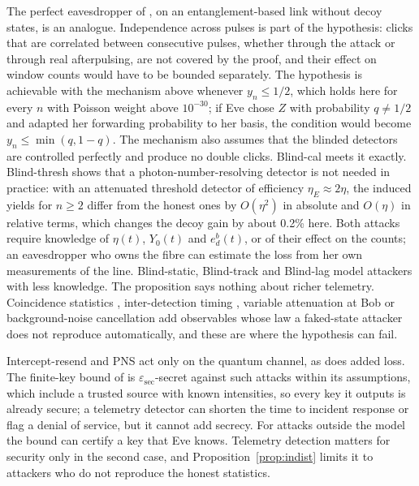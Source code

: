The perfect eavesdropper of \cite{gerhardt2011}, on an entanglement-based link without decoy states, is an analogue. Independence across pulses is part of the hypothesis: clicks that are correlated between consecutive pulses, whether through the attack or through real afterpulsing, are not covered by the proof, and their effect on window counts would have to be bounded separately. The hypothesis is achievable with the mechanism above whenever $y_n\leq1/2$, which holds here for every $n$ with Poisson weight above $10^{-30}$; if Eve chose $Z$ with probability $q\neq1/2$ and adapted her forwarding probability to her basis, the condition would become $y_n\leq\min(q,1-q)$. The mechanism also assumes that the blinded detectors are controlled perfectly and produce no double clicks. Blind-cal meets it exactly. Blind-thresh shows that a photon-number-resolving detector is not needed in practice: with an attenuated threshold detector of efficiency $\eta_E\approx2\eta$, the induced yields for $n\geq2$ differ from the honest ones by $O(\eta^2)$ in absolute and $O(\eta)$ in relative terms, which changes the decoy gain by about 0.2\% here. Both attacks require knowledge of $\eta(t)$, $Y_0(t)$ and $e_d^b(t)$, or of their effect on the counts; an eavesdropper who owns the fibre can estimate the loss from her own measurements of the line. Blind-static, Blind-track and Blind-lag model attackers with less knowledge. The proposition says nothing about richer telemetry. Coincidence statistics \cite{gras2021}, inter-detection timing \cite{dasilva2012}, variable attenuation at Bob \cite{qian2019} or background-noise cancellation \cite{lee2016} add observables whose law a faked-state attacker does not reproduce automatically, and these are where the hypothesis can fail.

\begin{remark}\label{rem:inmodel}
Intercept-resend and PNS act only on the quantum channel, as does added loss. The finite-key bound of \cite{lim2014} is $\varepsilon_{\mathrm{sec}}$-secret against such attacks within its assumptions, which include a trusted source with known intensities, so every key it outputs is already secure; a telemetry detector can shorten the time to incident response or flag a denial of service, but it cannot add secrecy. For attacks outside the model the bound can certify a key that Eve knows. Telemetry detection matters for security only in the second case, and Proposition~\ref{prop:indist} limits it to attackers who do not reproduce the honest statistics.
\end{remark}

